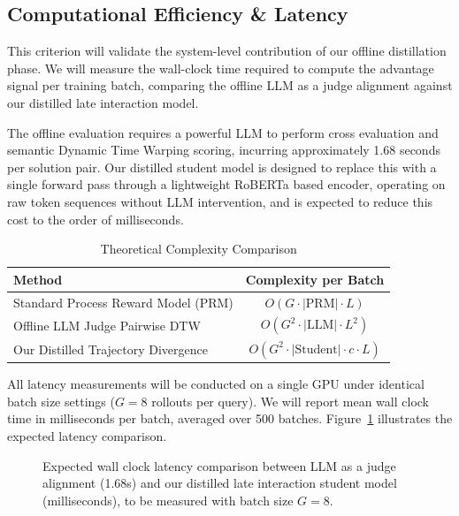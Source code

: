 \documentclass[conference]{IEEEtran}
\begin{document}
\subsection{Computational Efficiency \& Latency}

This criterion will validate the system-level contribution of our offline distillation phase. We will measure the wall-clock time required to compute the advantage signal per training batch, comparing the offline LLM as a judge alignment against our distilled late interaction model.

The offline evaluation requires a powerful LLM to perform cross evaluation and semantic Dynamic Time Warping scoring, incurring approximately 1.68 seconds per solution pair. Our distilled student model is designed to replace this with a single forward pass through a lightweight RoBERTa based encoder, operating on raw token sequences without LLM intervention, and is expected to reduce this cost to the order of milliseconds.

\begin{table}[htbp]
\centering
\caption{Theoretical Complexity Comparison}
\begin{tabular}{|l|c|}
\hline
\textbf{Method} & \textbf{Complexity per Batch} \\
\hline
Standard Process Reward Model (PRM) & $O(G \cdot |\mathrm{PRM}| \cdot L)$ \\
Offline LLM Judge Pairwise DTW & $O(G^2 \cdot |\mathrm{LLM}| \cdot L^2)$ \\
Our Distilled Trajectory Divergence & $O(G^2 \cdot |\mathrm{Student}| \cdot c \cdot L)$ \\
\hline
\end{tabular}
\end{table}

All latency measurements will be conducted on a single GPU under identical batch size settings ($G = 8$ rollouts per query). We will report mean wall clock time in milliseconds per batch, averaged over 500 batches. Figure~\ref{fig:placeholder} illustrates the expected latency comparison.

\begin{figure}[htbp]
\centering
{}
\caption{Expected wall clock latency comparison between LLM as a judge alignment (1.68s) and our distilled late interaction student model (milliseconds), to be measured with batch size $G=8$.}
\label{fig:placeholder}
\end{figure}
\end{document}
